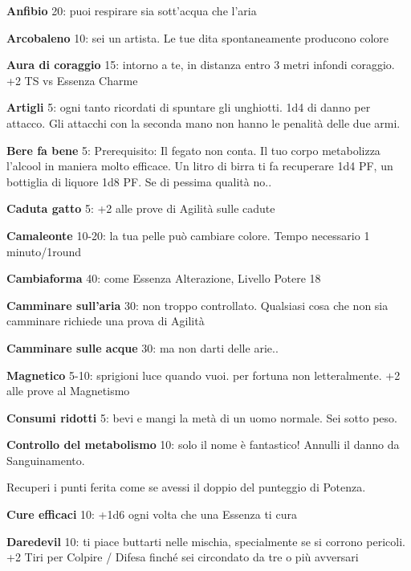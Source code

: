 \documentclass[a4paper,11pt,twoside,openany]{book}
\begin{document}
\textbf{Anfibio} 20: puoi respirare sia sott'acqua che l'aria

\textbf{Arcobaleno} 10: sei un artista. Le tue dita spontaneamente
producono colore

\textbf{Aura di coraggio} 15: intorno a te, in distanza entro 3 metri infondi coraggio. +2 TS vs Essenza Charme

\textbf{Artigli} 5: ogni tanto ricordati di spuntare gli unghiotti. 1d4 di danno per attacco. Gli attacchi con la seconda mano non hanno le penalità delle due armi.

\textbf{Bere fa bene} 5: Prerequisito: Il fegato non conta. Il tuo corpo metabolizza l'alcool in maniera molto efficace. Un litro di birra ti fa recuperare 1d4 PF, un bottiglia di liquore 1d8 PF. Se di pessima qualità no..

\textbf{Caduta gatto} 5: +2 alle prove di Agilità sulle cadute

\textbf{Camaleonte} 10-20: la tua pelle può cambiare colore. Tempo necessario 1 minuto/1round

\textbf{Cambiaforma} 40: come Essenza Alterazione, Livello Potere 18

\textbf{Camminare sull'aria} 30: non troppo controllato. Qualsiasi cosa che non sia camminare richiede una prova di Agilità

\textbf{Camminare sulle acque}  30: ma non darti delle arie..

\textbf{Magnetico} 5-10: sprigioni luce quando vuoi. per fortuna non letteralmente. +2 alle prove al Magnetismo

\textbf{Consumi ridotti} 5: bevi e mangi la metà di un uomo normale. Sei sotto peso.

\textbf{Controllo del metabolismo}  10: solo il nome è fantastico! Annulli il danno da Sanguinamento.

Recuperi i punti ferita come se avessi il doppio del punteggio di Potenza.

\textbf{Cure efficaci} 10: +1d6 ogni volta che una Essenza
ti cura

\textbf{Daredevil} 10: ti piace buttarti nelle mischia, specialmente se si corrono pericoli. +2 Tiri per Colpire / Difesa finché sei circondato da tre o più avversari
\end{document}
